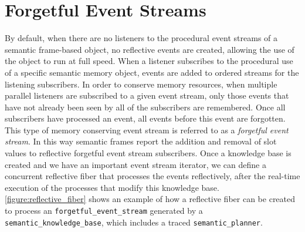 \section{Forgetful Event Streams}

By default, when there are no listeners to the procedural event
streams of a semantic frame-based object, no reflective events are
created, allowing the use of the object to run at full speed.  When a
listener subscribes to the procedural use of a specific semantic
memory object, events are added to ordered streams for the listening
subscribers.  In order to conserve memory resources, when multiple
parallel listeners are subscribed to a given event stream, only those
events that have not already been seen by all of the subscribers are
remembered.  Once all subscribers have processed an event, all events
before this event are forgotten.  This type of memory conserving event
stream is referred to as a \emph{forgetful event stream}.  In this way
semantic frames report the addition and removal of slot values to
reflective forgetful event stream subscribers.  Once a knowledge base
is created and we have an important event stream iterator, we can
define a concurrent reflective fiber that processes the events
reflectively, after the real-time execution of the processes that
modify this knowledge base.
{\mbox{\autoref{figure:reflective_fiber}}} shows an example of how a
reflective fiber can be created to process an
{\tt{forgetful\_event\_stream}} generated by a
{\tt{semantic\_knowledge\_base}}, which includes a traced
{\tt{semantic\_planner}}.
